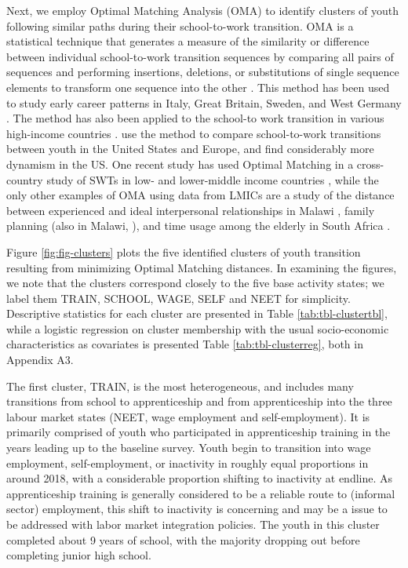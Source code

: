 \documentclass[
  a4paper, twoside, 12pt]{book}
\begin{document}
Next, we employ Optimal Matching Analysis (OMA) to identify clusters of youth following similar paths during their school-to-work transition. OMA is a statistical technique that generates a measure of the similarity or difference between individual school-to-work transition sequences by comparing all pairs of sequences and performing insertions, deletions, or substitutions of single sequence elements to transform one sequence into the other \autocite{elzinga2003}. This method has been used to study early career patterns in Italy, Great Britain, Sweden, and West Germany \autocite{halpin1998,anyadike-danes2005,scherer2001,scherer2005,biemann2012,achatz2022}. The method has also been applied to the school-to work transition in various high-income countries \autocite{schoon2001,mcvicar2002,brzinsky-fay2007,brzinsky-fay2014,brzinsky-fay2016,middeldorp2019}. \textcite{quintini2009} use the method to compare school-to-work transitions between youth in the United States and Europe, and find considerably more dynamism in the US. One recent study has used Optimal Matching in a cross-country study of SWTs in low- and lower-middle income countries \autocite{pesando2021}, while the only other examples of OMA using data from LMICs are a study of the distance between experienced and ideal interpersonal relationships in Malawi \autocite{frye2015}, family planning (also in Malawi, \textcite{furnas2016}), and time usage among the elderly in South Africa \autocite{grapsa2016}.

Figure \ref{fig:fig-clusters} plots the five identified clusters of youth transition resulting from minimizing Optimal Matching distances. In examining the figures, we note that the clusters correspond closely to the five base activity states; we label them TRAIN, SCHOOL, WAGE, SELF and NEET for simplicity. Descriptive statistics for each cluster are presented in Table \ref{tab:tbl-clustertbl}, while a logistic regression on cluster membership with the usual socio-economic characteristics as covariates is presented Table \ref{tab:tbl-clusterreg}, both in Appendix A3.

The first cluster, TRAIN, is the most heterogeneous, and includes many transitions from school to apprenticeship and from apprenticeship into the three labour market states (NEET, wage employment and self-employment). It is primarily comprised of youth who participated in apprenticeship training in the years leading up to the baseline survey. Youth begin to transition into wage employment, self-employment, or inactivity in roughly equal proportions in around 2018, with a considerable proportion shifting to inactivity at endline. As apprenticeship training is generally considered to be a reliable route to (informal sector) employment, this shift to inactivity is concerning and may be a issue to be addressed with labor market integration policies. The youth in this cluster completed about 9 years of school, with the majority dropping out before completing junior high school.
\end{document}
